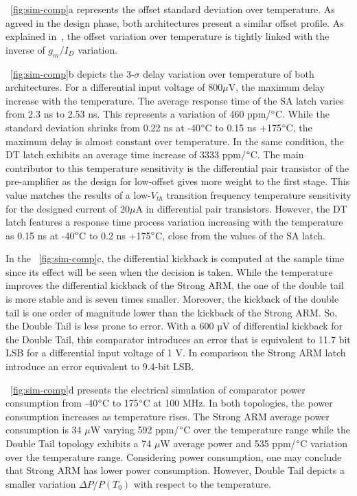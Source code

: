 \figurename~\ref{fig:sim-comp}a represents the offset standard deviation over temperature. As agreed in the design phase, both architectures present a similar offset profile. As explained in~\cite{Fonseca2017}, the offset variation over temperature is tightly linked with the inverse of \(g_{m}/I_D\) variation.

\figurename~\ref{fig:sim-comp}b depicts the 3-\(\sigma \) delay variation over temperature of both architectures. For a differential input voltage of 800\(\mu \)V, the maximum delay increase with the temperature. The average response time of the SA latch varies from 2.3 ns to 2.53 ns. This represents a variation of 460 ppm/\(\degree \)C. While the standard deviation shrinks from 0.22 ns at -40\(\degree \)C to 0.15 ns +175\(\degree \)C, the maximum delay is almost constant over temperature. In the same condition, the DT latch exhibits an average time increase of 3333 ppm/\(\degree \)C. The main contributor to this temperature sensitivity is the differential pair transistor of the pre-amplifier as the design for low-offset gives more weight to the first stage. This value matches the results of a low-\(V_{th} \) transition frequency temperature sensitivity for the designed current of 20\(\mu \)A in differential pair transistors. However, the DT latch features a response time process variation increasing with the temperature as  0.15 ns at -40\(\degree \)C to 0.2 ns +175\(\degree \)C, close from the values of the SA latch.

In the \figurename~\ref{fig:sim-comp}c, the differential kickback is computed at the sample time since its effect will be seen when the decision is taken. While the temperature improves the differential kickback of the Strong ARM, the one of the double tail is more stable and is seven times smaller. Moreover, the kickback of the double tail is one order of magnitude lower than the kickback of the Strong ARM\@. So, the Double Tail is less prone to error. With a 600 µV of differential kickback for the Double Tail, this comparator introduces an error that is equivalent to 11.7 bit LSB for a differential input voltage of 1 V. In comparison the Strong ARM latch introduce an error equivalent to 9.4-bit LSB\@.

\figurename~\ref{fig:sim-comp}d presents the electrical simulation of comparator power consumption from -40\(\degree \)C to 175\(\degree \)C at 100 MHz. In both topologies, the power consumption increases as temperature rises. The Strong ARM average power consumption is 34 \(\mu \)W varying 592 ppm/\(\degree \)C over the temperature range while the Double Tail topology exhibits a 74 \(\mu \)W average power and 535 ppm/\(\degree \)C variation over the temperature range. Considering power consumption, one may conclude that Strong ARM has lower power consumption. However, Double Tail depicts a smaller variation \(\Delta P/P(T_0)\) with respect to the temperature.

